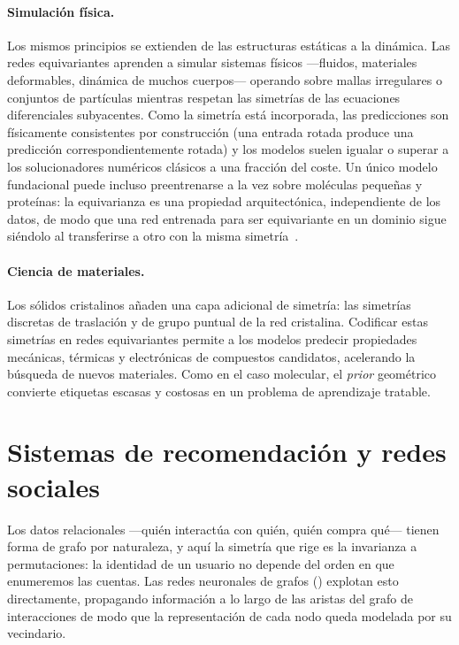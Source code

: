 \paragraph{Simulaci\'on f\'isica.}
Los mismos principios se extienden de las estructuras est\'aticas a la
din\'amica. Las redes equivariantes aprenden a simular sistemas f\'isicos
---fluidos, materiales deformables, din\'amica de muchos cuerpos--- operando
sobre mallas irregulares o conjuntos de part\'iculas mientras respetan las
simetr\'ias de las ecuaciones diferenciales subyacentes. Como la simetr\'ia est\'a
incorporada, las predicciones son f\'isicamente consistentes por construcci\'on
(una entrada rotada produce una predicci\'on correspondientemente rotada) y los
modelos suelen igualar o superar a los solucionadores num\'ericos cl\'asicos a una
fracci\'on del coste. Un \'unico modelo fundacional puede incluso preentrenarse a
la vez sobre mol\'eculas peque\~nas y prote\'inas: la equivarianza es una
propiedad arquitect\'onica, independiente de los datos, de modo que una red
entrenada para ser equivariante en un dominio sigue si\'endolo al transferirse a
otro con la misma simetr\'ia~\citep{jiao2024ept}.

\paragraph{Ciencia de materiales.}
Los s\'olidos cristalinos a\~naden una capa adicional de simetr\'ia: las
simetr\'ias discretas de traslaci\'on y de grupo puntual de la red cristalina.
Codificar estas simetr\'ias en redes equivariantes permite a los modelos predecir
propiedades mec\'anicas, t\'ermicas y electr\'onicas de compuestos candidatos,
acelerando la b\'usqueda de nuevos materiales. Como en el caso molecular, el
\emph{prior} geom\'etrico convierte etiquetas escasas y costosas en un problema
de aprendizaje tratable.

\section{Sistemas de recomendaci\'on y redes sociales}
\label{sec:apps:graphs}

Los datos relacionales ---qui\'en interact\'ua con qui\'en, qui\'en compra
qu\'e--- tienen forma de grafo por naturaleza, y aqu\'i la simetr\'ia que rige es
la invarianza a permutaciones: la identidad de un usuario no depende del orden en
que enumeremos las cuentas. Las redes neuronales de grafos ()
explotan esto directamente, propagando informaci\'on a lo largo de las aristas
del grafo de interacciones de modo que la representaci\'on de cada nodo queda
modelada por su vecindario.

